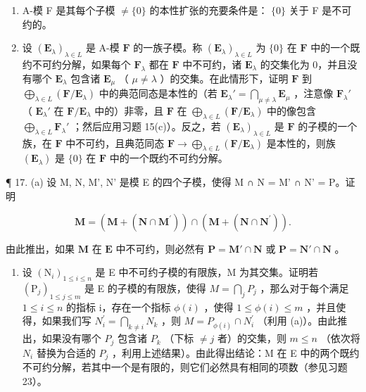 \begin{enumerate}
\def\labelenumi{(\alph{enumi})}
\item
  A-模 F 是其每个子模 \(\neq \{0\}\) 的本性扩张的充要条件是： \(\{0\}\) 关于 F 是不可约的。
\item
  设 \((\mathbf{E}_{\lambda})_{\lambda \in L}\) 是 A-模 \(\mathbf{F}\) 的一族子模。称 \((\mathbf{E}_{\lambda})_{\lambda \in L}\) 为 \(\{0\}\) 在 \(\mathbf{F}\) 中的一个既约不可约分解，如果每个 \(\mathbf{F}_{\lambda}\) 都在 \(\mathbf{F}\) 中不可约，诸 \(\mathbf{E}_{\lambda}\) 的交集化为 0，并且没有哪个 \(\mathbf{E}_{\lambda}\) 包含诸 \(\mathbf{E}_{\mu}\) （ \(\mu \neq \lambda\) ）的交集。在此情形下，证明 \(\mathbf{F}\) 到 \(\bigoplus_{\lambda \in L} (\mathbf{F} / \mathbf{E}_{\lambda})\) 中的典范同态是本性的（若 \(\mathbf{E}_{\lambda}' = \bigcap_{\mu \neq \lambda} \mathbf{E}_{\mu}\) ，注意像 \(\mathbf{F}_{\lambda}'\) （ \(\mathbf{E}_{\lambda}'\) 在 \(\mathbf{F} / \mathbf{E}_{\lambda}\) 中的）非零，且 \(\mathbf{F}\) 在 \(\bigoplus_{\lambda \in L} (\mathbf{F} / \mathbf{E}_{\lambda})\) 中的像包含 \(\bigoplus_{\lambda \in L} \mathbf{F}_{\lambda}'\) ；然后应用习题 15(c)）。反之，若 \((\mathbf{E}_{\lambda})_{\lambda \in L}\) 是 \(\mathbf{F}\) 的子模的一个族，在 \(\mathbf{F}\) 中不可约，且典范同态 \(\mathbf{F} \to \bigoplus_{\lambda \in L} (\mathbf{F} / \mathbf{E}_{\lambda})\) 是本性的，则族 \((\mathbf{E}_{\lambda})\) 是 \(\{0\}\) 在 \(\mathbf{F}\) 中的一个既约不可约分解。
\end{enumerate}

¶ 17. (a) 设 M, N, M', N' 是模 E 的四个子模，使得 M ∩ N = M' ∩ N' = P。证明

\[
\mathbf {M} = (\mathbf {M} + (\mathbf {N} \cap \mathbf {M} ^ {\prime})) \cap (\mathbf {M} + (\mathbf {N} \cap \mathbf {N} ^ {\prime})).
\]

由此推出，如果 \(\mathbf{M}\) 在 \(\mathbf{E}\) 中不可约，则必然有 \(\mathbf{P} = \mathbf{M}' \cap \mathbf{N}\) 或 \(\mathbf{P} = \mathbf{N}' \cap \mathbf{N}\) 。

\begin{enumerate}
\def\labelenumi{(\alph{enumi})}
\setcounter{enumi}{1}
\tightlist
\item
  设 \((\mathrm{N}_{i})_{1\leqslant i\leqslant n}\) 是 E 中不可约子模的有限族，M 为其交集。证明若 \((\mathrm{P}_{j})_{1\leqslant j\leqslant m}\) 是 E 的子模的有限族，使得 \(M=\bigcap_{j}P_{j}\) ，那么对于每个满足 \(1\leqslant i\leqslant n\) 的指标 i，存在一个指标 \(\phi(i)\) ，使得 \(1\leqslant\phi(i)\leqslant m\) ，并且使得，如果我们写 \(N_{i}^{\prime}=\bigcap_{k\neq i}N_{k}\) ，则 \(M=P_{\phi(i)}\cap N_{i}^{\prime}\) （利用 (a)）。由此推出，如果没有哪个 \(P_{j}\) 包含诸 \(P_{k}\) （下标 \(\neq j\) 者）的交集，则 \(m\leqslant n\) （依次将 \(N_{i}\) 替换为合适的 \(P_{j}\) ，利用上述结果）。由此得出结论：M 在 E 中的两个既约不可约分解，若其中一个是有限的，则它们必然具有相同的项数（参见习题 23）。
\end{enumerate}

